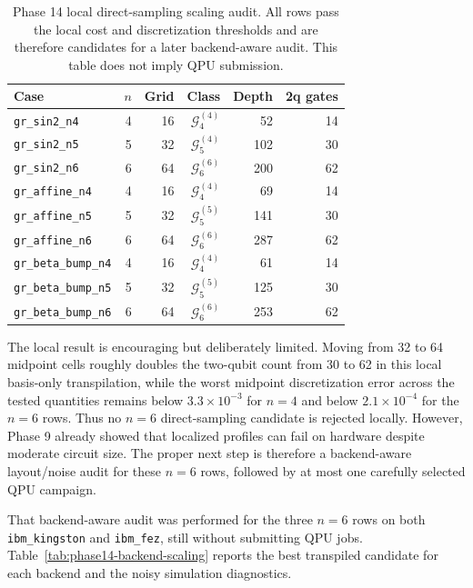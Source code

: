 \begin{table}[h]
\centering
\small
\begin{tabular}{lrrrrr}
\toprule
Case & \(n\) & Grid & Class & Depth & 2q gates \\
\midrule
\texttt{gr\_sin2\_n4} & 4 & 16 & \(\mathcal{G}^{(4)}_4\) & 52 & 14 \\
\texttt{gr\_sin2\_n5} & 5 & 32 & \(\mathcal{G}^{(4)}_5\) & 102 & 30 \\
\texttt{gr\_sin2\_n6} & 6 & 64 & \(\mathcal{G}^{(6)}_6\) & 200 & 62 \\
\texttt{gr\_affine\_n4} & 4 & 16 & \(\mathcal{G}^{(4)}_4\) & 69 & 14 \\
\texttt{gr\_affine\_n5} & 5 & 32 & \(\mathcal{G}^{(5)}_5\) & 141 & 30 \\
\texttt{gr\_affine\_n6} & 6 & 64 & \(\mathcal{G}^{(6)}_6\) & 287 & 62 \\
\texttt{gr\_beta\_bump\_n4} & 4 & 16 & \(\mathcal{G}^{(4)}_4\) & 61 & 14 \\
\texttt{gr\_beta\_bump\_n5} & 5 & 32 & \(\mathcal{G}^{(5)}_5\) & 125 & 30 \\
\texttt{gr\_beta\_bump\_n6} & 6 & 64 & \(\mathcal{G}^{(6)}_6\) & 253 & 62 \\
\bottomrule
\end{tabular}
\caption{Phase 14 local direct-sampling scaling audit. All rows pass the local
cost and discretization thresholds and are therefore candidates for a later
backend-aware audit. This table does not imply QPU submission.}
\label{tab:phase14-direct-scaling}
\end{table}

The local result is encouraging but deliberately limited. Moving from 32 to 64
midpoint cells roughly doubles the two-qubit count from 30 to 62 in this local
basis-only transpilation, while the worst midpoint discretization error across
the tested quantities remains below \(3.3\times10^{-3}\) for \(n=4\) and below
\(2.1\times10^{-4}\) for the \(n=6\) rows. Thus no \(n=6\) direct-sampling
candidate is rejected locally. However, Phase 9 already showed that localized
profiles can fail on hardware despite moderate circuit size. The proper next
step is therefore a backend-aware layout/noise audit for these \(n=6\) rows,
followed by at most one carefully selected QPU campaign.

That backend-aware audit was performed for the three \(n=6\) rows on both
\texttt{ibm\_kingston} and \texttt{ibm\_fez}, still without submitting QPU
jobs. Table~\ref{tab:phase14-backend-scaling} reports the best transpiled
candidate for each backend and the noisy simulation diagnostics.

